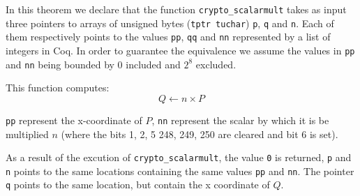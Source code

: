 In this theorem we declare that the function \texttt{crypto\_scalarmult} takes as
input three pointers to arrays of unsigned bytes (\texttt{tptr tuchar}) \texttt{p},
\texttt{q} and \texttt{n}.
Each of them respectively points to the values \texttt{pp},  \texttt{qq} and  \texttt{nn}
represented by a list of integers in Coq. In order to guarantee the equivalence
we assume the values in \texttt{pp} and \texttt{nn} being bounded by $0$ included
and $2^8$ excluded.

This function computes: $$Q \leftarrow n \times P$$

\texttt{pp} represent the x-coordinate of $P$, \texttt{nn} represent the
scalar by which it is be multiplied $n$ (where the bits 1, 2, 5 248, 249, 250
are cleared and bit 6 is set).

As a result of the excution of \texttt{crypto\_scalarmult}, the value \texttt{0} is returned,
\texttt{p} and \texttt{n} points to the same locations containing the same values \texttt{pp} and \texttt{nn}.
The pointer \texttt{q} points to the same location, but contain the x coordinate of $Q$.
